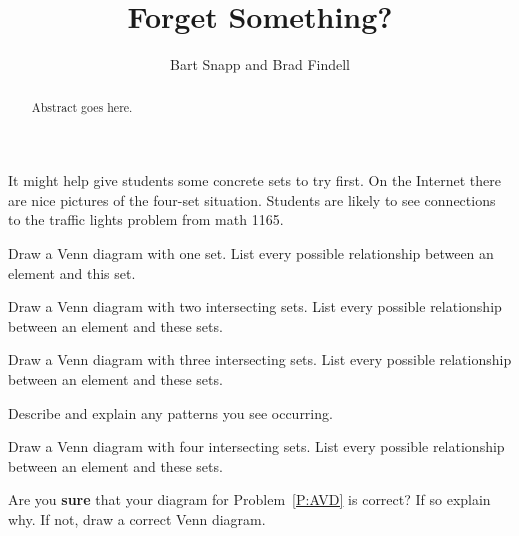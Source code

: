 \documentclass{ximera}
\author{Bart Snapp and Brad Findell}
\title{Forget Something?}
\begin{document}
\begin{abstract}
Abstract goes here.  
\end{abstract}
\maketitle


\begin{instructorIntro}
It might help give students some concrete sets to try first.  On the Internet there are nice pictures of the four-set situation. Students are likely to see connections to the traffic lights problem from math 1165.
\end{instructorIntro}

\begin{problem} 
Draw a Venn diagram with one set. List every possible relationship
between an element and this set. 
\end{problem}

\begin{problem} 
Draw a Venn diagram with two intersecting sets. List every possible
relationship between an element and these sets.
\end{problem}


\begin{problem} 
Draw a Venn diagram with three intersecting sets. List every possible
relationship between an element and these sets.
\end{problem}

\begin{problem}
Describe and explain any patterns you see occurring.
\end{problem}

\begin{problem}\label{P:AVD}
Draw a Venn diagram with four intersecting sets. List every possible
relationship between an element and these sets.
\end{problem}

\begin{problem}
Are you \textbf{sure} that your diagram for Problem~\ref{P:AVD} is
correct? If so explain why. If not, draw a correct Venn diagram.
\end{problem}
\end{document}
